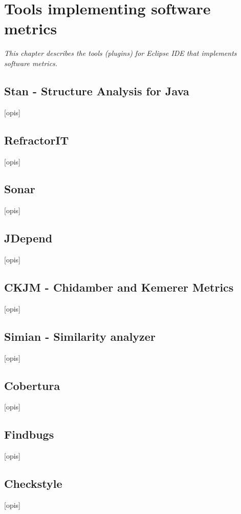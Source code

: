 \chapter{Tools implementing software metrics} \label{roz:metrics-tools}

\textit{This chapter describes the tools (plugins) for Eclipse IDE that implements software metrics.} 

\section{Stan - Structure Analysis for Java} 
[opis]
\section{RefractorIT}
[opis]
\section{Sonar}
[opis]
\section{JDepend}
[opis]
\section{CKJM - Chidamber and Kemerer Metrics}
[opis]
\section{Simian - Similarity analyzer}
[opis]
\section{Cobertura}
[opis]
\section{Findbugs}
[opis]
\section{Checkstyle}
[opis]
